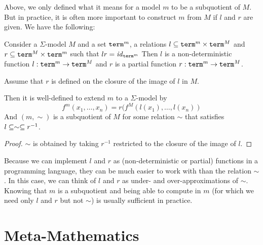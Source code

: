 Above, we only defined what it means for a model $m$ to be a subquotient of $M$.
But in practice, it is often more important to construct $m$ from $M$ if $l$ and $r$ are given.
We have the following:
\begin{theorem}
Consider a $\Sigma$-model $M$ and a set $\mathtt{term}^m$, a relations $l\subseteq\mathtt{term}^m\times\mathtt{term}^M$ and $r\subseteq\mathtt{term}^M\times\mathtt{term}^m$ such that $lr=\mathit{id}_{\mathtt{term}^m}$ Then $l$ is a non-deterministic function $l:\mathtt{term}^m\to\mathtt{term}^M$ and $r$ is a partial function $r:\mathtt{term}^m\to\mathtt{term}^M$.

Assume that $r$ is defined on the closure of the image of $l$ in $M$.

Then it is well-defined to extend $m$ to a $\Sigma$-model by \[f^m(x_1,\ldots,x_n)=r(f^M(l(x_1),\ldots,l(x_n))\]
And $(m,\sim)$ is a subquotient of $M$ for some relation $\sim$ that satisfies $l\subseteq\sim\subseteq r^{-1}$.
\end{theorem}
\begin{proof}
$\sim$ is obtained by taking $r^{-1}$ restricted to the closure of the image of $l$.
\end{proof}

Because we can implement $l$ and $r$ as (non-deterministic or partial) functions in a programming language, they can be much easier to work with than the relation $\sim$.
In this case, we can think of $l$ and $r$ as under- and over-approximations of $\sim$.
Knowing that $m$ is a subquotient and being able to compute in $m$ (for which we need only $l$ and $r$ but not $\sim$) is usually sufficient in practice.

%


\section{Meta-Mathematics}\label{sec:univ:meta}

